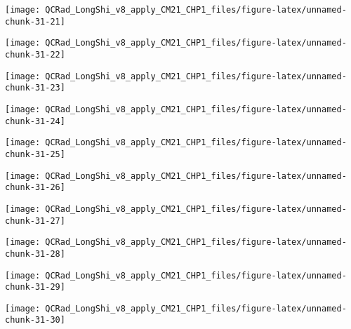 \documentclass[
  10pt,
  a4paper,oneside]{article}
\begin{document}
\begin{center}\texttt{[image: QCRad\_LongShi\_v8\_apply\_CM21\_CHP1\_files/figure-latex/unnamed-chunk-31-21]} \end{center}

\begin{center}\texttt{[image: QCRad\_LongShi\_v8\_apply\_CM21\_CHP1\_files/figure-latex/unnamed-chunk-31-22]} \end{center}

\begin{center}\texttt{[image: QCRad\_LongShi\_v8\_apply\_CM21\_CHP1\_files/figure-latex/unnamed-chunk-31-23]} \end{center}

\begin{center}\texttt{[image: QCRad\_LongShi\_v8\_apply\_CM21\_CHP1\_files/figure-latex/unnamed-chunk-31-24]} \end{center}

\begin{center}\texttt{[image: QCRad\_LongShi\_v8\_apply\_CM21\_CHP1\_files/figure-latex/unnamed-chunk-31-25]} \end{center}

\begin{center}\texttt{[image: QCRad\_LongShi\_v8\_apply\_CM21\_CHP1\_files/figure-latex/unnamed-chunk-31-26]} \end{center}

\begin{center}\texttt{[image: QCRad\_LongShi\_v8\_apply\_CM21\_CHP1\_files/figure-latex/unnamed-chunk-31-27]} \end{center}

\begin{center}\texttt{[image: QCRad\_LongShi\_v8\_apply\_CM21\_CHP1\_files/figure-latex/unnamed-chunk-31-28]} \end{center}

\begin{center}\texttt{[image: QCRad\_LongShi\_v8\_apply\_CM21\_CHP1\_files/figure-latex/unnamed-chunk-31-29]} \end{center}

\begin{center}\texttt{[image: QCRad\_LongShi\_v8\_apply\_CM21\_CHP1\_files/figure-latex/unnamed-chunk-31-30]} \end{center}
\end{document}
